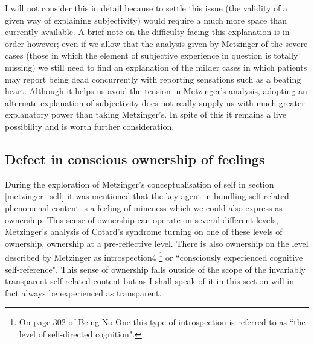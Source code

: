 I will not consider this in detail because to settle this issue (the validity of a given way of explaining subjectivity) would require a much more space than currently available. A brief note on the difficulty facing this explanation is in order however; even if we allow that the analysis given by Metzinger of the severe cases (those in which the element of subjective experience in question is totally missing) we still need to find an explanation of the milder cases in which patients may report being dead concurrently with reporting sensations such as a beating heart. Although it helps us avoid the tension in Metzinger's analysis, adopting an alternate explanation of subjectivity does not really supply us with much greater explanatory power than taking Metzinger's. In spite of this it remains a live possibility and is worth further consideration.

\subsection{Defect in conscious ownership of feelings}
\label{psych_alternatives_defect}

During the exploration of Metzinger's conceptualisation of self in section \ref{metzinger_self} it was mentioned that the key agent in bundling self-related phenomenal content is a feeling of mineness which we could also express as ownership. This sense of ownership can operate on several different levels, Metzinger's analysis of Cotard's syndrome turning on one of these levels of ownership, ownership at a pre-reflective level. There is also ownership on the level described by Metzinger as introspection4 \cite[pp. 36, 302]{metzinger2003}\footnote{On page 302 of Being No One this type of introspection is referred to as ``the level of self-directed cognition".} or ``consciously experienced cognitive self-reference". This sense of ownership falls outside of the scope of the invariably transparent self-related content but as I shall speak of it in this section will in fact always be experienced as transparent.

